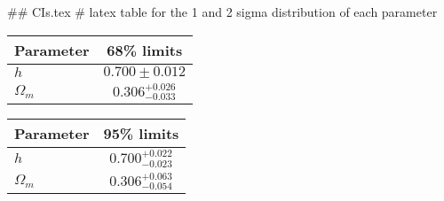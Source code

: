 ## CIs.tex
# latex table for the 1 and 2 sigma distribution of each parameter

\begin{tabular} { l  c}
 Parameter &  68\% limits\\
\hline
{\boldmath$h              $} & $0.700\pm 0.012            $\\
{\boldmath$\Omega_m       $} & $0.306^{+0.026}_{-0.033}   $\\
\hline
\end{tabular}

\begin{tabular} { l  c}
 Parameter &  95\% limits\\
\hline
{\boldmath$h              $} & $0.700^{+0.022}_{-0.023}   $\\
{\boldmath$\Omega_m       $} & $0.306^{+0.063}_{-0.054}   $\\
\hline
\end{tabular}
